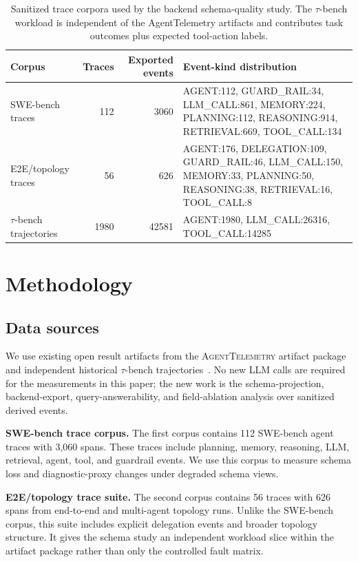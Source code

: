 \documentclass[conference]{IEEEtran}
\begin{document}
\begin{table}[t]
\centering
\scriptsize
\caption{Sanitized trace corpora used by the backend schema-quality
study. The $\tau$-bench workload is independent of the AgentTelemetry
artifacts and contributes task outcomes plus expected tool-action
labels.}
\label{tab:corpora}
\begin{tabular}{@{}lrrp{}@{}}
\toprule
Corpus & Traces & Exported events & Event-kind distribution \\
\midrule
SWE-bench traces & 112 & 3060 & AGENT:112, GUARD\_RAIL:34, LLM\_CALL:861, MEMORY:224, PLANNING:112, REASONING:914, RETRIEVAL:669, TOOL\_CALL:134 \\
E2E/topology traces & 56 & 626 & AGENT:176, DELEGATION:109, GUARD\_RAIL:46, LLM\_CALL:150, MEMORY:33, PLANNING:50, REASONING:38, RETRIEVAL:16, TOOL\_CALL:8 \\
$\tau$-bench trajectories & 1980 & 42581 & AGENT:1980, LLM\_CALL:26316, TOOL\_CALL:14285 \\
\bottomrule
\end{tabular}
\end{table}

\section{Methodology}
\label{sec:method}

\subsection{Data sources}

We use existing open result artifacts from the \textsc{AgentTelemetry}
artifact package~\cite{agenttelemetry_artifact} and independent
historical $\tau$-bench trajectories~\cite{taubench}. No new LLM calls
are required for the measurements in this paper; the new work is the
schema-projection, backend-export, query-answerability, and
field-ablation analysis over sanitized derived events.

\textbf{SWE-bench trace corpus.} The first corpus contains 112 SWE-bench
agent traces with 3,060 spans. These traces include planning, memory,
reasoning, LLM, retrieval, agent, tool, and guardrail events. We use
this corpus to measure schema loss and diagnostic-proxy changes under
degraded schema views.

\textbf{E2E/topology trace suite.} The second corpus contains 56 traces
with 626 spans from end-to-end and multi-agent topology runs. Unlike the
SWE-bench corpus, this suite includes explicit delegation events and
broader topology structure. It gives the schema study an independent
workload slice within the artifact package rather than only the
controlled fault matrix.
\end{document}

